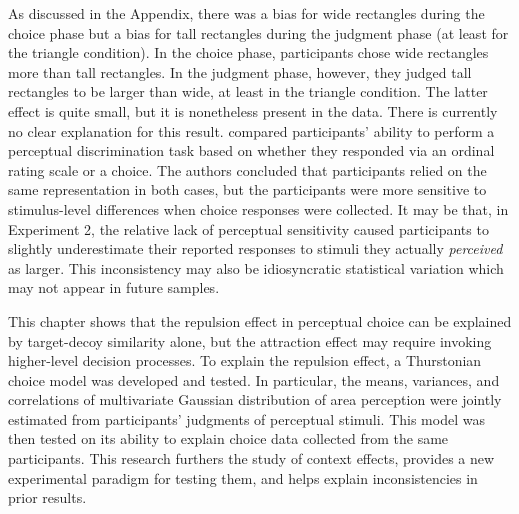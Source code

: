 As discussed in the Appendix, there was a bias for wide rectangles during the choice phase but a bias for tall rectangles during the judgment phase (at least for the triangle condition). In the choice phase, participants chose wide rectangles more than tall rectangles. In the judgment phase, however, they judged tall rectangles to be larger than wide, at least in the triangle condition. The latter effect is quite small, but it is nonetheless present in the data. There is currently no clear explanation for this result. \textcite{gronau2023choice} compared participants' ability to perform a perceptual discrimination task based on whether they responded via an ordinal rating scale or a choice. The authors concluded that participants relied on the same representation in both cases, but the participants were more sensitive to stimulus-level differences when choice responses were collected. It may be that, in Experiment 2, the relative lack of perceptual sensitivity caused participants to slightly underestimate their reported responses to stimuli they actually \textit{perceived} as larger. This inconsistency may also be idiosyncratic statistical variation which may not appear in future samples. 

This chapter shows that the repulsion effect in perceptual choice can be explained by target-decoy similarity alone, but the attraction effect may require invoking higher-level decision processes. To explain the repulsion effect, a Thurstonian choice model was developed and tested. In particular, the means, variances, and correlations of multivariate Gaussian distribution of area perception were jointly estimated from participants' judgments of perceptual stimuli. This model was then tested on its ability to explain choice data collected from the same participants. This research furthers the study of context effects, provides a new experimental paradigm for testing them, and helps explain inconsistencies in prior results.
